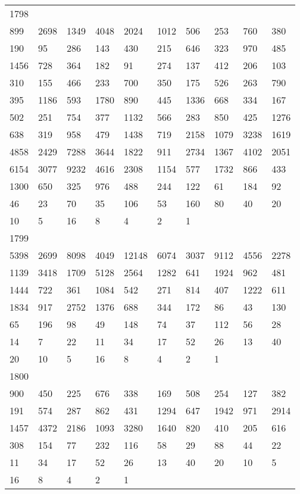\begin{longtable}{*{10}{l}}
1798&&&&&&&&&\\
899& 2698& 1349& 4048& 2024& 1012& 506& 253& 760& 380\\
190& 95& 286& 143& 430& 215& 646& 323& 970& 485\\
1456& 728& 364& 182& 91& 274& 137& 412& 206& 103\\
310& 155& 466& 233& 700& 350& 175& 526& 263& 790\\
395& 1186& 593& 1780& 890& 445& 1336& 668& 334& 167\\
502& 251& 754& 377& 1132& 566& 283& 850& 425& 1276\\
638& 319& 958& 479& 1438& 719& 2158& 1079& 3238& 1619\\
4858& 2429& 7288& 3644& 1822& 911& 2734& 1367& 4102& 2051\\
6154& 3077& 9232& 4616& 2308& 1154& 577& 1732& 866& 433\\
1300& 650& 325& 976& 488& 244& 122& 61& 184& 92\\
46& 23& 70& 35& 106& 53& 160& 80& 40& 20\\
10& 5& 16& 8& 4& 2& 1& \\

1799&&&&&&&&&\\
5398& 2699& 8098& 4049& 12148& 6074& 3037& 9112& 4556& 2278\\
1139& 3418& 1709& 5128& 2564& 1282& 641& 1924& 962& 481\\
1444& 722& 361& 1084& 542& 271& 814& 407& 1222& 611\\
1834& 917& 2752& 1376& 688& 344& 172& 86& 43& 130\\
65& 196& 98& 49& 148& 74& 37& 112& 56& 28\\
14& 7& 22& 11& 34& 17& 52& 26& 13& 40\\
20& 10& 5& 16& 8& 4& 2& 1& \\

1800&&&&&&&&&\\
900& 450& 225& 676& 338& 169& 508& 254& 127& 382\\
191& 574& 287& 862& 431& 1294& 647& 1942& 971& 2914\\
1457& 4372& 2186& 1093& 3280& 1640& 820& 410& 205& 616\\
308& 154& 77& 232& 116& 58& 29& 88& 44& 22\\
11& 34& 17& 52& 26& 13& 40& 20& 10& 5\\
16& 8& 4& 2& 1& \\


\end{longtable}
